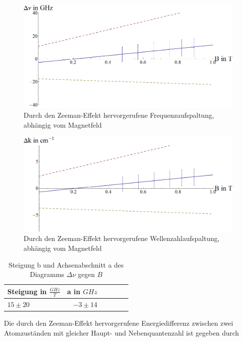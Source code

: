 \documentclass[10pt,a4paper]{article}
\begin{document}
\begin{figure}[h]
	\includegraphics[scale = 0.5]{frequenzaufspaltung.png}
	\centering
	\caption{Durch den Zeeman-Effekt hervorgerufene Frequenzaufspaltung, abhängig vom Magnetfeld}
	\label{diagramm_aufspaltung}
\end{figure}
\begin{figure}[h]
	\includegraphics[scale = 0.5]{wellenzahlaufspaltung.png}
	\centering
	\caption{Durch den Zeeman-Effekt hervorgerufene Wellenzahlaufspaltung, abhängig vom Magnetfeld}
	\label{diagramm_aufspaltung_wellenzahl}
\end{figure}


\begin{table}[h!]
	\centering
	\begin{tabular}{|l|r|c|lrp{16cm}}\hline
		Steigung in $\frac{GHz}{T}$ & a in $GHz$\\\hline
		$15 \pm 20$ & $-3 \pm 14$\\\hline
	\end{tabular}
	\caption{Steigung b und Achsenabschnitt a  des Diagramms $\Delta\nu$ gegen $B$}
	\label{diagramm_werte}
\end{table}



Die durch den Zeeman-Effekt hervorgerufene Energiedifferenz zwischen zwei Atomzuständen mit gleicher Haupt- und Nebenquantenzahl ist gegeben durch
\end{document}
